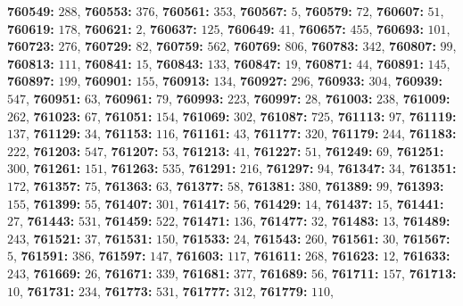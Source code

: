 \textsf{\bfseries 760549:} $288$, \textsf{\bfseries 760553:} $376$, \textsf{\bfseries 760561:} $353$, \textsf{\bfseries 760567:} $5$, \textsf{\bfseries 760579:} $72$, \textsf{\bfseries 760607:} $51$, \textsf{\bfseries 760619:} $178$, \textsf{\bfseries 760621:} $2$, \textsf{\bfseries 760637:} $125$, \textsf{\bfseries 760649:} $41$, \textsf{\bfseries 760657:} $455$, \textsf{\bfseries 760693:} $101$, \textsf{\bfseries 760723:} $276$, \textsf{\bfseries 760729:} $82$, \textsf{\bfseries 760759:} $562$, \textsf{\bfseries 760769:} $806$, \textsf{\bfseries 760783:} $342$, \textsf{\bfseries 760807:} $99$, \textsf{\bfseries 760813:} $111$, \textsf{\bfseries 760841:} $15$, \textsf{\bfseries 760843:} $133$, \textsf{\bfseries 760847:} $19$, \textsf{\bfseries 760871:} $44$, \textsf{\bfseries 760891:} $145$, \textsf{\bfseries 760897:} $199$, \textsf{\bfseries 760901:} $155$, \textsf{\bfseries 760913:} $134$, \textsf{\bfseries 760927:} $296$, \textsf{\bfseries 760933:} $304$, \textsf{\bfseries 760939:} $547$, \textsf{\bfseries 760951:} $63$, \textsf{\bfseries 760961:} $79$, \textsf{\bfseries 760993:} $223$, \textsf{\bfseries 760997:} $28$, \textsf{\bfseries 761003:} $238$, \textsf{\bfseries 761009:} $262$, \textsf{\bfseries 761023:} $67$, \textsf{\bfseries 761051:} $154$, \textsf{\bfseries 761069:} $302$, \textsf{\bfseries 761087:} $725$, \textsf{\bfseries 761113:} $97$, \textsf{\bfseries 761119:} $137$, \textsf{\bfseries 761129:} $34$, \textsf{\bfseries 761153:} $116$, \textsf{\bfseries 761161:} $43$, \textsf{\bfseries 761177:} $320$, \textsf{\bfseries 761179:} $244$, \textsf{\bfseries 761183:} $222$, \textsf{\bfseries 761203:} $547$, \textsf{\bfseries 761207:} $53$, \textsf{\bfseries 761213:} $41$, \textsf{\bfseries 761227:} $51$, \textsf{\bfseries 761249:} $69$, \textsf{\bfseries 761251:} $300$, \textsf{\bfseries 761261:} $151$, \textsf{\bfseries 761263:} $535$, \textsf{\bfseries 761291:} $216$, \textsf{\bfseries 761297:} $94$, \textsf{\bfseries 761347:} $34$, \textsf{\bfseries 761351:} $172$, \textsf{\bfseries 761357:} $75$, \textsf{\bfseries 761363:} $63$, \textsf{\bfseries 761377:} $58$, \textsf{\bfseries 761381:} $380$, \textsf{\bfseries 761389:} $99$, \textsf{\bfseries 761393:} $155$, \textsf{\bfseries 761399:} $55$, \textsf{\bfseries 761407:} $301$, \textsf{\bfseries 761417:} $56$, \textsf{\bfseries 761429:} $14$, \textsf{\bfseries 761437:} $15$, \textsf{\bfseries 761441:} $27$, \textsf{\bfseries 761443:} $531$, \textsf{\bfseries 761459:} $522$, \textsf{\bfseries 761471:} $136$, \textsf{\bfseries 761477:} $32$, \textsf{\bfseries 761483:} $13$, \textsf{\bfseries 761489:} $243$, \textsf{\bfseries 761521:} $37$, \textsf{\bfseries 761531:} $150$, \textsf{\bfseries 761533:} $24$, \textsf{\bfseries 761543:} $260$, \textsf{\bfseries 761561:} $30$, \textsf{\bfseries 761567:} $5$, \textsf{\bfseries 761591:} $386$, \textsf{\bfseries 761597:} $147$, \textsf{\bfseries 761603:} $117$, \textsf{\bfseries 761611:} $268$, \textsf{\bfseries 761623:} $12$, \textsf{\bfseries 761633:} $243$, \textsf{\bfseries 761669:} $26$, \textsf{\bfseries 761671:} $339$, \textsf{\bfseries 761681:} $377$, \textsf{\bfseries 761689:} $56$, \textsf{\bfseries 761711:} $157$, \textsf{\bfseries 761713:} $10$, \textsf{\bfseries 761731:} $234$, \textsf{\bfseries 761773:} $531$, \textsf{\bfseries 761777:} $312$, \textsf{\bfseries 761779:} $110$, 
